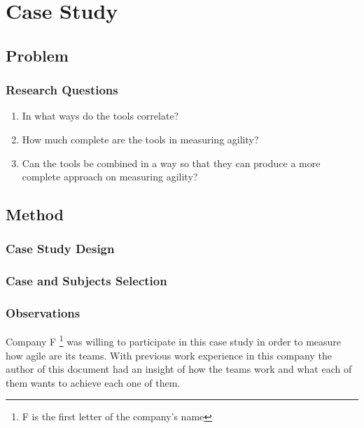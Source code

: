 \chapter{Case Study}\label{ch:case study}

\newcommand{\mysubparagraph}[1]{\subparagraph{#1}\mbox{}\\}

\section{Problem}


\subsection{Research Questions}
\begin{enumerate}
\item In what ways do the tools correlate?
\item How much complete are the tools in measuring agility?
\item Can the tools be combined in a way so that they can produce a more complete approach on measuring agility?
\end{enumerate}

\section{Method}

\subsection{Case Study Design}

\subsection{Case and Subjects Selection}

\subsection{Observations}
Company F \footnote{F is the first letter of the company's name} was willing to participate in this case study in order to measure how agile are its teams. With previous work experience in this company the author of this document had an insight of how the teams work and what each of them wants to achieve each one of them. 

